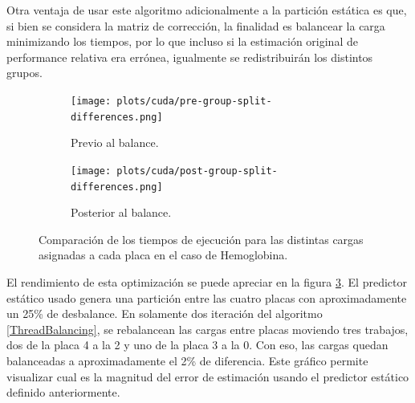 Otra ventaja de usar este algoritmo adicionalmente a la partici\'on est\'atica es que, si bien se considera la matriz
de correcci\'on, la finalidad es balancear la carga minimizando los tiempos, por lo que incluso si la estimaci\'on original
de performance relativa era err\'onea, igualmente se redistribuir\'an los distintos grupos.


\begin{figure}[htbp]
   \centering
   \begin{subfigure}[b]{\plotwidthtres}
     \texttt{[image: plots/cuda/pre-group-split-differences.png]}
     \caption{Previo al balance.}
     \label{fig:cuda-lio-imbalance-between-loads}
   \end{subfigure}
   \begin{subfigure}[b]{\plotwidthtres}
     \texttt{[image: plots/cuda/post-group-split-differences.png]}
     \caption{Posterior al balance.}
     \label{fig:cuda-lio-imbalance-fixed}
   \end{subfigure}
   \caption{Comparaci\'on de los tiempos de ejecuci\'on para las distintas
   cargas asignadas a cada placa en el caso de Hemoglobina.}
   \label{fig:cuda-lio-imbalance}
\end{figure}

El rendimiento de esta optimizaci\'on se puede apreciar en la figura \ref{fig:cuda-lio-imbalance}. El predictor est\'atico
usado genera una partici\'on entre las cuatro placas con aproximadamente un 25\% de desbalance. En solamente
dos iteraci\'on del algoritmo \ref{ThreadBalancing}, se rebalancean las cargas entre placas moviendo tres trabajos, dos
de la placa 4 a la 2 y uno de la placa 3 a la 0. Con eso, las cargas quedan balanceadas a aproximadamente el 2\% de diferencia.
Este gr\'afico permite visualizar cual es la magnitud del error de estimaci\'on usando el predictor est\'atico definido anteriormente.

